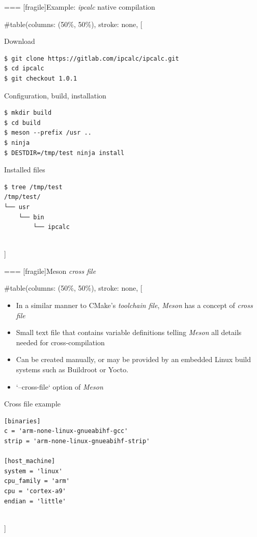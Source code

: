 === [fragile]{Example: {\em ipcalc} native compilation}

  
#table(columns: (50\%, 50\%), stroke: none,
[
    \begin{block}{Download}
      {\tiny
\begin{verbatim}
$ git clone https://gitlab.com/ipcalc/ipcalc.git
$ cd ipcalc
$ git checkout 1.0.1
\end{verbatim}
      }
    \end{block}

    \begin{block}{Configuration, build, installation}
      {\tiny
\begin{verbatim}
$ mkdir build
$ cd build
$ meson --prefix /usr ..
$ ninja
$ DESTDIR=/tmp/test ninja install
\end{verbatim}
      }
    \end{block}


    \begin{block}{Installed files}
      {\tiny
\begin{verbatim}
$ tree /tmp/test
/tmp/test/
└── usr
    └── bin
        └── ipcalc
\end{verbatim}
      }
    \end{block}
  \\]


=== [fragile]{Meson {\em cross file}}
  
#table(columns: (50\%, 50\%), stroke: none,
[
    \begin{itemize}
    \item In a similar manner to CMake's {\em toolchain file}, {\em
        Meson} has a concept of {\em cross file}
    \item Small text file that contains variable definitions telling
      {\em Meson} all details needed for cross-compilation
    \item Can be created manually, or may be provided by an embedded
      Linux build systems such as Buildroot or Yocto.
    \item `--cross-file` option of {\em Meson}
    \end{itemize}
    \begin{block}{Cross file example}
      {\tiny
\begin{verbatim}
[binaries]
c = 'arm-none-linux-gnueabihf-gcc'
strip = 'arm-none-linux-gnueabihf-strip'

[host_machine]
system = 'linux'
cpu_family = 'arm'
cpu = 'cortex-a9'
endian = 'little'
\end{verbatim}
      }
    \end{block}
  \\]


